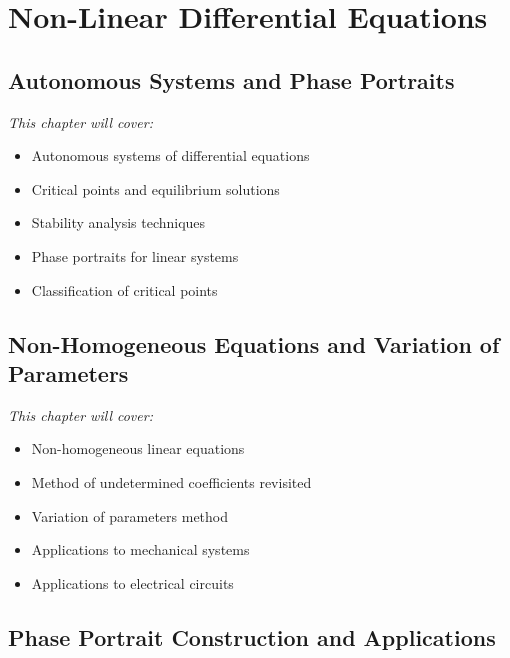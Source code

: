 \documentclass[12pt, letterpaper]{book}
\theoremstyle{problemstyle}
\theoremstyle{solutionstyle}
\begin{document}
\part{Non-Linear Differential Equations}
\label{part:nonlinear_de}

\chapter{Autonomous Systems and Phase Portraits}
\label{chap:session_14}

\textit{This chapter will cover:}
\begin{itemize}
    \item Autonomous systems of differential equations
    \item Critical points and equilibrium solutions
    \item Stability analysis techniques
    \item Phase portraits for linear systems
    \item Classification of critical points
\end{itemize}

\chapter{Non-Homogeneous Equations and Variation of Parameters}
\label{chap:session_15}

\textit{This chapter will cover:}
\begin{itemize}
    \item Non-homogeneous linear equations
    \item Method of undetermined coefficients revisited
    \item Variation of parameters method
    \item Applications to mechanical systems
    \item Applications to electrical circuits
\end{itemize}

\chapter{Phase Portrait Construction and Applications}
\label{chap:session_16}
\end{document}
